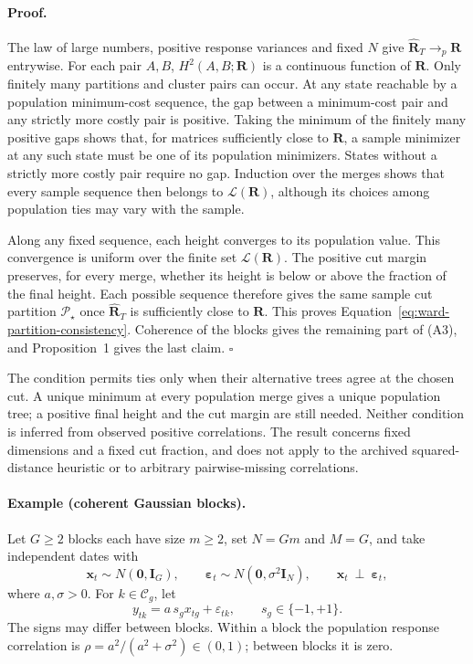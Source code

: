 \documentclass[11pt,a4paper]{article}
\begin{document}
\paragraph{Proof.}
The law of large numbers, positive response variances and fixed $N$ give
$\widehat{\bm R}_T\to_p\bm R$ entrywise. For each pair $A,B$,
$H^2(A,B;\bm R)$ is a continuous function of $\bm R$.
Only finitely many partitions and cluster pairs can occur. At any state
reachable by a population minimum-cost sequence, the gap between a
minimum-cost pair and any strictly more costly pair is positive. Taking
the minimum of the finitely many positive gaps shows that, for matrices
sufficiently close to $\bm R$, a sample minimizer at any such state must
be one of its population minimizers. States without a strictly more
costly pair require no gap. Induction over the merges shows that every
sample sequence then belongs to $\mathcal L(\bm R)$, although its choices
among population ties may vary with the sample.

Along any fixed sequence, each height converges to its population value.
This convergence is uniform over the finite set $\mathcal L(\bm R)$.
The positive cut margin preserves, for every merge, whether its height
is below or above the fraction of the final height. Each possible sequence
therefore gives the same sample cut partition $\mathcal P_\star$ once
$\widehat{\bm R}_T$ is sufficiently close to $\bm R$. This proves
Equation~\eqref{eq:ward-partition-consistency}. Coherence of the blocks
gives the remaining part of (A3), and Proposition~1 gives the last claim.
\hfill$\square$

The condition permits ties only when their alternative trees agree at the
chosen cut. A unique minimum at every population merge gives a unique
population tree; a positive final height and the cut margin are still
needed. Neither condition is inferred from observed positive correlations.
The result concerns fixed dimensions and a fixed cut fraction, and does
not apply to the archived squared-distance heuristic or to arbitrary
pairwise-missing correlations.

\paragraph{Example (coherent Gaussian blocks).}
\label{ex:ward-coherent-blocks}
Let $G\geq2$ blocks each have size $m\geq2$, set $N=Gm$ and $M=G$, and
take independent dates with
\[
 \bm x_t\sim N(\bm0,\bm I_G),\qquad
 \bm\varepsilon_t\sim N(\bm0,\sigma^2\bm I_N),\qquad
 \bm x_t\ \perp\ \bm\varepsilon_t,
\]
where $a,\sigma>0$. For $k\in\mathcal C_g$, let
\begin{equation}\label{eq:ward-block-model}
 y_{tk}=a\,s_gx_{tg}+\varepsilon_{tk},\qquad s_g\in\{-1,+1\}.
\end{equation}
The signs may differ between blocks. Within a block the population
response correlation is $\rho=a^2/(a^2+\sigma^2)\in(0,1)$; between
blocks it is zero.
\end{document}
